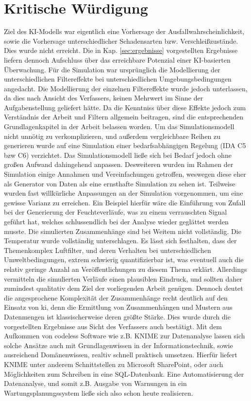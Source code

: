     \section{Kritische Würdigung}
    Ziel des KI-Modells war eigentlich eine Vorhersage der Ausfallwahrscheinlichkeit, sowie die Vorhersage unterschiedlicher Schadensarten bzw. Verschleißzustände. Dies wurde nicht erreicht. Die in Kap. \ref{sec:ergebnisse} vorgestellten Ergebnisse liefern dennoch Aufschluss über das erreichbare Potenzial einer KI-basierten Überwachung. 
    Für die Simulation war ursprünglich die Modellierung der unterschiedlichen Filtereffekte bei unterschiedlichen Umgebungsbedingungen angedacht. Die Modellierung der einzelnen Filtereffekte wurde jedoch unterlassen, da dies nach Ansicht des Verfassers, keinen Mehrwert im Sinne der Aufgabenstellung geliefert hätte. Da die Kenntniss über diese Effekte jedoch zum Verständnis der Arbeit und Filtern allgemein beitragen, sind die entsprechenden Grundlagenkapitel in der Arbeit belassen worden. Um das Simulationsmodell nicht unnötig zu verkomplizieren, und außerdem vergleichbare Reihen zu generieren wurde auf eine Simulation einer bedarfsabhängigen Regelung (IDA C5 bzw C6) verzichtet.
    Das Simulationsmodell ließe sich bei Bedarf jedoch ohne großen Aufwand dahingehend anpassen. Desweiteren wurden im Rahmen der Simulation einige Annahmen und Vereinfachungen getroffen, weswegen diese eher als Generator von Daten als eine ernsthafte Simulation zu sehen ist. Teilweise wurden fast willkürliche Anpassungen an der Simulation vorgenommen, um eine gewisse Varianz zu erreichen. Ein Beispiel hierfür wäre die Einführung von Zufall bei der Generierung der Feuchteverläufe, was zu einem verrauschten Signal geführt hat, welches schlussendlich bei der Analyse wieder geglättet werden musste.
    Die simulierten Zusammenhänge sind bei Weitem nicht vollständig. Die Temperatur wurde vollständig unterschlagen. Es lässt sich festhalten, dass der Themenkomplex Luftfilter, und deren Verhalten bei unterschiedlichen Umweltbedingungen, extrem schwierig quantifizierbar ist, was eventuell auch die relativ geringe Anzahl an Veröffentlichungen zu diesem Thema erklärt. \newline
    Allerdings vermitteln die simulierten Verläufe einen plausiblen Eindruck, und sollten daher zumindest qualitativ dem Ziel der vorliegenden Arbeit genügen.
    Dennoch deutet die angesprochene Komplexität der Zusammenhänge recht deutlich auf den Einsatz von \ac{ki}, denn die Ermittlung von Zusammenhängen und Mustern aus Datenmengen ist klassischerweise deren größte Stärke. Dies wurde durch die vorgestellten Ergebnisse aus Sicht des Verfassers auch bestätigt. Mit dem Aufkommen von codeless Software wie z.B. \ac{KNIME} zur Datenanalyse lassen sich solche Ansätze auch mit Grundlagenwissen in der Informationstechnik, sowie ausreichend Domänenwissen, realtiv schnell praktisch umsetzen. Hierfür liefert \ac{KNIME} unter anderem Schnittstellen zu Microsoft SharePoint, oder auch Möglichkeiten zum Schreiben in eine SQL-Datenbank. Eine Automatisierung der Datenanalyse, und somit z.B. Ausgabe von Warnungen in ein Wartungsplanungssystem ließe sich also schon heute realisieren. 
